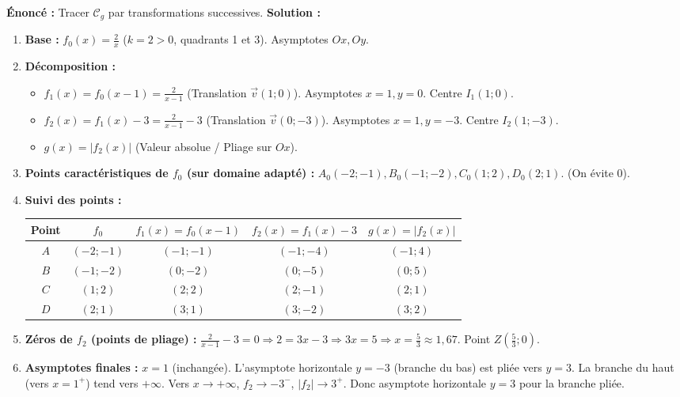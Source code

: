 \documentclass[11pt]{article}
\begin{document}
\begin{exoresolu}[{Synthèse : $g(x) = \left| \frac{2}{x-1} - 3 \right|$ sur $]{- \infty}; 1[ \cup ]1; 3]$}]
\textbf{Énoncé :} Tracer $\mathcal{C}_g$ par transformations successives.
\textbf{Solution :}
\begin{enumerate}
    \item \textbf{Base :} $f_0(x) = \frac{2}{x}$ ($k=2>0$, quadrants 1 et 3). Asymptotes $Ox, Oy$.
    \item \textbf{Décomposition :}
        \begin{itemize}
            \item $f_1(x) = f_0(x-1) = \frac{2}{x-1}$ (Translation $\vec{v}(1;0)$). Asymptotes $x=1, y=0$. Centre $I_1(1;0)$.
            \item $f_2(x) = f_1(x) - 3 = \frac{2}{x-1} - 3$ (Translation $\vec{v}(0;-3)$). Asymptotes $x=1, y=-3$. Centre $I_2(1;-3)$.
            \item $g(x) = |f_2(x)|$ (Valeur absolue / Pliage sur $Ox$).
        \end{itemize}
    \item \textbf{Points caractéristiques de $f_0$ (sur domaine adapté) :} $A_0(-2;-1), B_0(-1;-2), C_0(1;2), D_0(2;1)$. (On évite 0).
    \item \textbf{Suivi des points :}
    \begin{center}
    \begin{tabular}{|c|c|c|c|c|}\hline
    Point & $f_0$ & $f_1(x)=f_0(x-1)$ & $f_2(x)=f_1(x)-3$ & $g(x)=|f_2(x)|$ \\ \hline
    $A$ & $(-2;-1)$ & $(-1;-1)$ & $(-1;-4)$ & $(-1;4)$ \\ \hline
    $B$ & $(-1;-2)$ & $(0;-2)$ & $(0;-5)$ & $(0;5)$ \\ \hline
    $C$ & $(1;2)$ & $(2;2)$ & $(2;-1)$ & $(2;1)$ \\ \hline
    $D$ & $(2;1)$ & $(3;1)$ & $(3;-2)$ & $(3;2)$ \\ \hline
    \end{tabular}
    \end{center}
    \item \textbf{Zéros de $f_2$ (points de pliage) :} $\frac{2}{x-1}-3=0 \Rightarrow 2=3x-3 \Rightarrow 3x=5 \Rightarrow x=\frac{5}{3} \approx 1,67$. Point $Z(\frac{5}{3};0)$.
    \item \textbf{Asymptotes finales :} $x=1$ (inchangée). L'asymptote horizontale $y=-3$ (branche du bas) est pliée vers $y=3$. La branche du haut (vers $x=1^+$) tend vers $+\infty$. Vers $x \to +\infty$, $f_2 \to -3^-$, $|f_2| \to 3^+$. Donc asymptote horizontale $y=3$ pour la branche pliée.

\end{enumerate}
\end{exoresolu}
\end{document}
